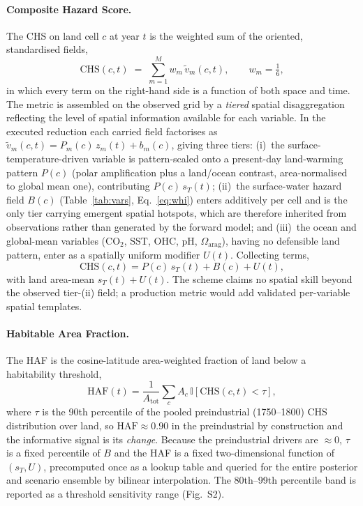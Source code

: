 \documentclass[10pt]{article}
\begin{document}
\paragraph*{Composite Hazard Score.}
The CHS on land cell $c$ at year $t$ is the weighted sum of the oriented,
standardised fields,
\begin{equation}
\mathrm{CHS}(c,t) \;=\; \sum_{m=1}^{M} w_m\,\tilde v_m(c,t),
\qquad w_m = \tfrac{1}{6},
\label{eq:chs}
\end{equation}
in which every term on the right-hand side is a function of both space and time.
The metric is assembled on the observed grid by a \emph{tiered} spatial
disaggregation reflecting the level of spatial information available for each
variable. In the executed reduction each carried field factorises as
$\tilde v_m(c,t)=P_m(c)\,z_m(t)+b_m(c)$, giving three tiers:
(i)~the surface-temperature-driven variable is pattern-scaled onto a present-day
land-warming pattern $P(c)$ (polar amplification plus a land/ocean contrast,
area-normalised to global mean one), contributing $P(c)\,s_T(t)$;
(ii)~the surface-water hazard field $B(c)$ (Table~\ref{tab:vars}, Eq.~\ref{eq:whi})
enters additively per cell and is the only tier carrying emergent spatial
hotspots, which are therefore inherited from observations rather than generated by
the forward model; and
(iii)~the ocean and global-mean variables (CO$_2$, SST, OHC, pH,
$\Omega_{\mathrm{arag}}$), having no defensible land pattern, enter as a
spatially uniform modifier $U(t)$. Collecting terms,
\begin{equation}
\mathrm{CHS}(c,t) = P(c)\,s_T(t) + B(c) + U(t),
\label{eq:chs_tiered}
\end{equation}
with land area-mean $s_T(t)+U(t)$. The scheme claims no spatial skill beyond the
observed tier-(ii) field; a production metric would add validated per-variable
spatial templates.

\paragraph*{Habitable Area Fraction.}
The HAF is the cosine-latitude area-weighted fraction of land below a habitability
threshold,
\begin{equation}
\mathrm{HAF}(t) = \frac{1}{A_{\mathrm{tot}}}\sum_{c} A_c\,
\mathbb{I}\!\left[\mathrm{CHS}(c,t) < \tau\right],
\label{eq:haf}
\end{equation}
where $\tau$ is the 90th percentile of the pooled preindustrial (1750--1800) CHS
distribution over land, so $\mathrm{HAF}\approx0.90$ in the preindustrial by
construction and the informative signal is its \emph{change}. Because the
preindustrial drivers are $\approx0$, $\tau$ is a fixed percentile of $B$ and the
HAF is a fixed two-dimensional function of $(s_T,U)$, precomputed once as a lookup
table and queried for the entire posterior and scenario ensemble by bilinear
interpolation. The 80th--99th percentile band is reported as a threshold
sensitivity range (Fig.~S2).
\end{document}
